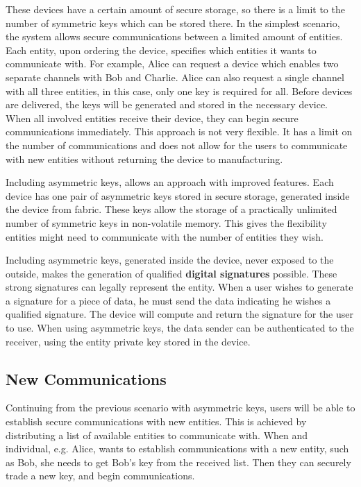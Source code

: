 These devices have a certain amount of secure storage, so there is a limit to the number of symmetric keys which can be stored there.
In the simplest scenario, the system allows secure communications between a limited amount of entities. Each entity, upon ordering the device, specifies which entities it wants to communicate with. For example, Alice can request a device which enables two separate channels with Bob and Charlie. Alice can also request a single channel with all three entities, in this case, only one key is required for all.
Before devices are delivered, the keys will be generated and stored in the necessary device. When all involved entities receive their device, they can begin secure communications immediately.
This approach is not very flexible. It has a limit on the number of communications and does not allow for the users to communicate with new entities without returning the device to manufacturing.

Including asymmetric keys, allows an approach with improved features.
Each device has one pair of asymmetric keys stored in secure storage, generated inside the device from fabric. These keys allow the storage of a practically unlimited number of symmetric keys in non-volatile memory. This gives the flexibility entities might need to communicate with the number of entities they wish.

Including asymmetric keys, generated inside the device, never exposed to the outside, makes the generation of qualified \textbf{digital signatures} possible. These strong signatures can legally represent the entity. When a user wishes to generate a signature for a piece of data, he must send the data indicating he wishes a qualified signature. The device will compute and return the signature for the user to use.
When using asymmetric keys, the data sender can be authenticated to the receiver, using the entity private key stored in the device.

\subsection{New Communications}\label{chap:problem:scenarios:keys}
Continuing from the previous scenario with asymmetric keys, users will be able to establish secure communications with new entities. This is achieved by distributing a list of available entities to communicate with.
When and individual, e.g. Alice, wants to establish communications with a new entity, such as Bob, she needs to get Bob's key from the received list. Then they can securely trade a new key, and begin communications.

